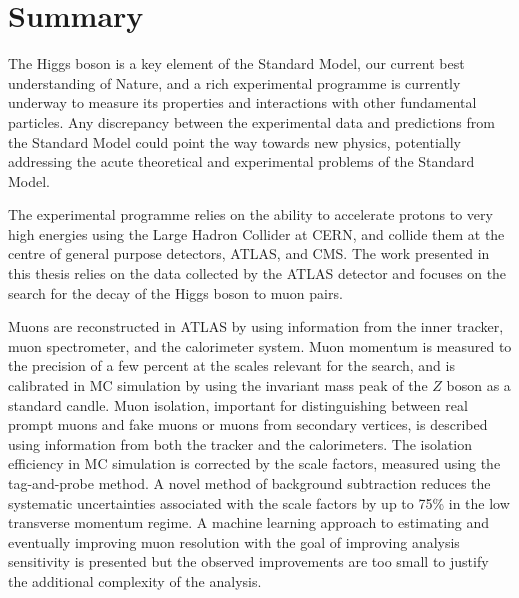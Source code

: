 \chapter*{Summary}

The Higgs boson is a key element of the Standard Model,
our current best understanding of Nature, and a rich experimental
programme is currently underway to measure its properties
and interactions with other fundamental particles. Any
discrepancy between the experimental data and predictions
from the Standard Model could point the way towards new
physics, potentially addressing the acute theoretical
and experimental problems of the Standard Model.

The experimental programme relies on the ability to
accelerate protons to very high energies using the Large
Hadron Collider at CERN, and collide them at the centre of
general purpose detectors, ATLAS, and CMS. The work presented
in this thesis relies on the data collected by the ATLAS
detector and focuses on the search for the decay of the
Higgs boson to muon pairs.

Muons are reconstructed in ATLAS by using information
from the inner tracker, muon spectrometer, and the
calorimeter system. Muon momentum is measured to the
precision of a few percent at the scales relevant for
the search, and is calibrated in MC simulation by using
the invariant mass peak of the $Z$ boson as a standard
candle. Muon isolation, important for distinguishing
between real prompt muons and fake muons or muons from
secondary vertices, is described using information from
both the tracker and the calorimeters. The isolation
efficiency in MC simulation is corrected by the scale
factors, measured using the tag-and-probe method. A
novel method of background subtraction reduces the
systematic uncertainties associated with the
scale factors by up to 75\% in the low transverse
momentum regime. A machine learning approach to
estimating and eventually improving muon resolution
with the goal of improving analysis sensitivity is
presented but the observed improvements are too small
to justify the additional complexity of the analysis.

